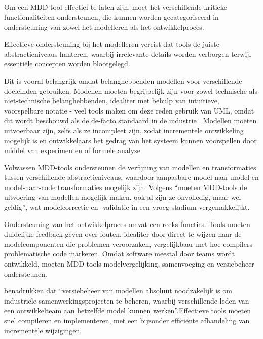 \subsection{}%
Om een \gls{MDD}-tool effectief te laten zijn, moet het verschillende kritieke functionaliteiten ondersteunen, die kunnen worden gecategoriseerd in ondersteuning van zowel het modelleren als het ontwikkelproces.

Effectieve ondersteuning bij het modelleren vereist dat tools de juiste abstractieniveaus hanteren, waarbij irrelevante details worden verborgen terwijl essentiële concepten worden blootgelegd. 

Dit is vooral belangrijk omdat belanghebbenden modellen voor verschillende doeleinden gebruiken. Modellen moeten begrijpelijk zijn voor zowel technische als niet-technische belanghebbenden, idealiter met behulp van intuïtieve, voorspelbare notatie - veel tools maken om deze reden gebruik van \gls{UML}, omdat dit wordt beschouwd als de de-facto standaard in de industrie \autocite{Marin2015} . Modellen moeten uitvoerbaar zijn, zelfs als ze incompleet zijn, zodat incrementele ontwikkeling mogelijk is en ontwikkelaars het gedrag van het systeem kunnen voorspellen door middel van experimenten of formele analyse. 

Volwassen \gls{MDD}-tools ondersteunen de verfijning van modellen en transformaties tussen verschillende abstractieniveaus, waardoor aanpasbare model-naar-model en model-naar-code transformaties mogelijk zijn. Volgens \textcite{Marin2015} “moeten \gls{MDD}-tools de uitvoering van modellen mogelijk maken, ook al zijn ze onvolledig, maar wel geldig”, wat modelcorrectie en -validatie in een vroeg stadium vergemakkelijkt.

Ondersteuning van het ontwikkelproces omvat een reeks functies. Tools moeten duidelijke feedback geven over fouten, idealiter door direct te wijzen naar de modelcomponenten die problemen veroorzaken, vergelijkbaar met hoe compilers problematische code markeren. 
Omdat software meestal door teams wordt ontwikkeld, moeten \gls{MDD}-tools modelvergelijking, samenvoeging en versiebeheer ondersteunen. 

\textcite{Marin2015} benadrukken dat “versiebeheer van modellen absoluut noodzakelijk is om industriële samenwerkingsprojecten te beheren, waarbij verschillende leden van een ontwikkelteam aan hetzelfde model kunnen werken”.Effectieve tools moeten snel compileren en implementeren, met een bijzonder efficiënte afhandeling van incrementele wijzigingen.


